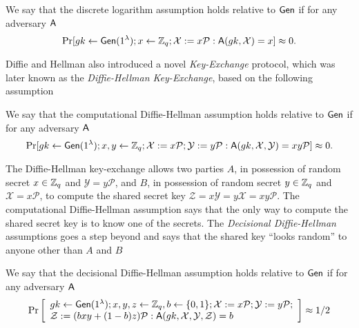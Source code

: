 \begin{definition}
We say that the discrete logarithm assumption holds relative to $\mathsf{Gen}$ if for any adversary $\mathsf{A}$
$$
\Pr[gk\gets\mathsf{Gen}(1^\lambda); x\gets\mathbb{Z}_q; \mathcal{X}:=x\mathcal{P}:\mathsf{A}(gk,\mathcal{X})=x]\approx 0.
$$
\end{definition}
 
Diffie and Hellman also introduced a novel \emph{Key-Exchange} protocol, which was later known as the \emph{Diffie-Hellman Key-Exchange}, based on the following assumption

\begin{definition}
We say that the computational Diffie-Hellman assumption holds relative to $\mathsf{Gen}$ if for any adversary $\mathsf{A}$
$$
\Pr[gk\gets\mathsf{Gen}(1^\lambda); x,y\gets\mathbb{Z}_q; \mathcal{X}:=x\mathcal{P};\mathcal{Y}:=y\mathcal{P}:\mathsf{A}(gk,\mathcal{X},\mathcal{Y})=xy\mathcal{P}]\approx 0.
$$
\end{definition}

The Diffie-Hellman key-exchange allows two parties $A$, in possession of random secret $x\in\mathbb{Z}_q$ and $\mathcal{Y}=y\mathcal{P}$, and $B$, in possession of random secret $y\in\mathbb{Z}_q$ and $\mathcal{X}=x\mathcal{P}$, to compute the shared secret key $\mathcal{Z}=x\mathcal{Y}=y\mathcal{X}=xy\mathcal{P}$. The computational Diffie-Hellman assumption says that the only way to compute the shared secret key is to know one of the secrets. The \emph{Decisional Diffie-Hellman} assumptions goes a step beyond and says that the shared key ``looks random'' to anyone other than $A$ and $B$

\begin{definition}
We say that the decisional Diffie-Hellman assumption holds relative to $\mathsf{Gen}$ if for any adversary $\mathsf{A}$
$$
\Pr\left[\begin{array}{l}
gk\gets\mathsf{Gen}(1^\lambda); x,y,z\gets\mathbb{Z}_q,b\gets\{0,1\};\mathcal{X}:=x\mathcal{P};\mathcal{Y}:=y\mathcal{P};\\
\mathcal{Z}:=(bxy+(1-b)z)\mathcal{P}:\mathsf{A}(gk,\mathcal{X},\mathcal{Y},\mathcal{Z})=b
\end{array}\right]\approx 1/2
$$
\end{definition}


